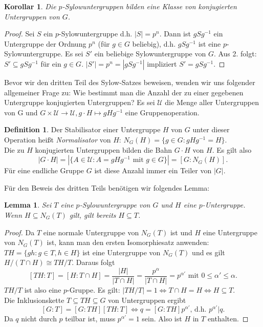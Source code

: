 \documentclass[12pt]{scrartcl} %
\newtheorem{lemma}{Lemma}
\newtheorem{kor}{Korollar}
\theoremstyle{definition}
\newtheorem*{defn}{Definition}
\theoremstyle{remark}
\begin{document}
\begin{kor}
	Die $p$-Sylowuntergruppen bilden eine Klasse von konjugierten Untergruppen von $G$.
\end{kor}

\begin{proof}
	Sei $S$ ein $p$-Sylowuntergruppe d.h. $|S| = p^n$. Dann ist $gSg^{-1}$ ein Untergruppe der Ordnung $p^n$ (für $g \in G$ beliebig), d.h. $gSg^{-1}$ ist eine $p$-Sylowuntergruppe. Es sei $S'$ ein beliebige Sylowuntergruppe von $G$. Aus 2. folgt: $S' \subseteq gSg^{-1}$ für ein $g \in G$. $|S'| = p^n = |gSg^{-1}|$ impliziert $S' = gSg^{-1}$.
\end{proof}

Bevor wir den dritten Teil des Sylow-Satzes beweisen, wenden wir uns folgender allgemeiner Frage zu: Wie bestimmt man die Anzahl der zu einer gegebenen Untergruppe konjugierten Untergruppen? Es sei $\mathcal{U}$ die Menge aller Untergruppen von G und $ G \times \mathcal{U} \rightarrow \mathcal{U}, g \cdot H \mapsto gHg^{-1} $ eine Gruppenoperation.

\begin{defn}
	Der Stabilisator einer Untergruppe $H$ von $G$ unter dieser Operation heißt \emph{Normalisator} von $H$: $N_G(H) = \{ g \in G: gHg^{-1} = H \}$. \\
	Die zu $H$ konjugierten Untergruppen bilden die Bahn $G \cdot H$ von $H$. Es gilt also
	$$ |G \cdot H| = | \{ A \in \mathcal{U} : A = gHg^{-1} \text{ mit } g \in G \} | = [G:N_G(H)] .$$
	Für eine endliche Gruppe $G$ ist diese Anzahl immer ein Teiler von $|G|$.
\end{defn}

Für den Beweis des dritten Teils benötigen wir folgendes Lemma:

\begin{lemma}\label{lem:Sylow}
	Sei $T$ eine $p$-Sylowuntergruppe von $G$ und $H$ eine $p$-Untergruppe. Wenn $H \subseteq N_G(T)$ gilt, gilt bereits $H \subseteq T$.
\end{lemma}

\begin{proof}
	Da $T$ eine normale Untergruppe von $N_G(T)$ ist und $H$ eine Untergruppe von $N_G(T)$ ist, kann man den ersten Isomorphiesatz anwenden: $TH = \{ gh : g \in T, h \in H \}$ ist eine Untergruppe von $N_G(T)$ und es gilt $H/(T \cap H) \cong TH/T$. Daraus folgt
	$$ [TH : T] = [H : T \cap H] = \frac{|H|}{|T \cap H|} = \frac{p^{\alpha}}{|T \cap H|} = p^{\alpha '} \text{ mit } 0 \leq \alpha ' \leq \alpha.$$
	$TH/T$ ist also eine $p$-Gruppe. Es gilt: $|TH/T| = 1 \Leftrightarrow T \cap H = H \Leftrightarrow H \subseteq T$. \\
	Die Inklusionskette $T \subseteq TH \subseteq G$ von Untergruppen ergibt
	$$[G:T] = [G:TH][TH:T] \Leftrightarrow q = [G:TH]p^{\alpha '} \text{, d.h. } p^{\alpha '} | q.$$
	Da $q$ nicht durch $p$ teilbar ist, muss $p^{\alpha '} = 1$ sein. Also ist $H$ in $T$ enthalten.
\end{proof}
\end{document}
